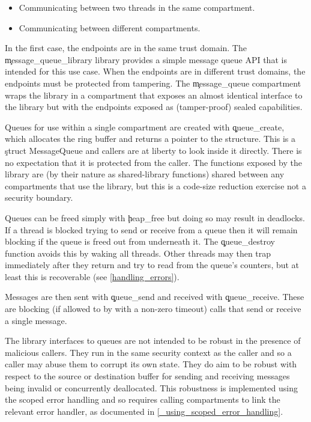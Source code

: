 \begin{itemize}
	\item{Communicating between two threads in the same compartment.}
	\item{Communicating between different compartments.}
\end{itemize}

In the first case, the endpoints are in the same trust domain.
The \c{message_queue_library} library provides a simple message queue API that is intended for this use case.
When the endpoints are in different trust domains, the endpoints must be protected from tampering.
The \c{message_queue} compartment wraps the library in a compartment that exposes an almost identical interface to the library but with the endpoints exposed as (tamper-proof) sealed capabilities.

Queues for use within a single compartment are created with \c{queue_create}, which allocates the ring buffer and returns a pointer to the structure.
This is a \c{struct MessageQueue} and callers are at liberty to look inside it directly.
There is no expectation that it is protected from the caller.
The functions exposed by the library are (by their nature as shared-library functions) shared between any compartments that use the library, but this is a code-size reduction exercise not a security boundary.


Queues can be freed simply with \c{heap_free} but doing so may result in deadlocks.
If a thread is blocked trying to send or receive from a queue then it will remain blocking if the queue is freed out from underneath it.
The \c{queue_destroy} function avoids this by waking all threads.
Other threads may then trap immediately after they return and try to read from the queue's counters, but at least this is recoverable (see \ref{handling_errors}).


Messages are then sent with \c{queue_send} and received with \c{queue_receive}.
These are blocking (if allowed to by with a non-zero timeout) calls that send or receive a single message.



\begin{caution}
The library interfaces to queues are not intended to be robust in the presence of malicious callers.
They run in the same security context as the caller and so a caller may abuse them to corrupt its own state.
They do aim to be robust with respect to the source or destination buffer for sending and receiving messages being invalid or concurrently deallocated.
This robustness is implemented using the scoped error handling and so requires calling compartments to link the relevant error handler, as documented in \ref{_using_scoped_error_handling}.
\end{caution}

